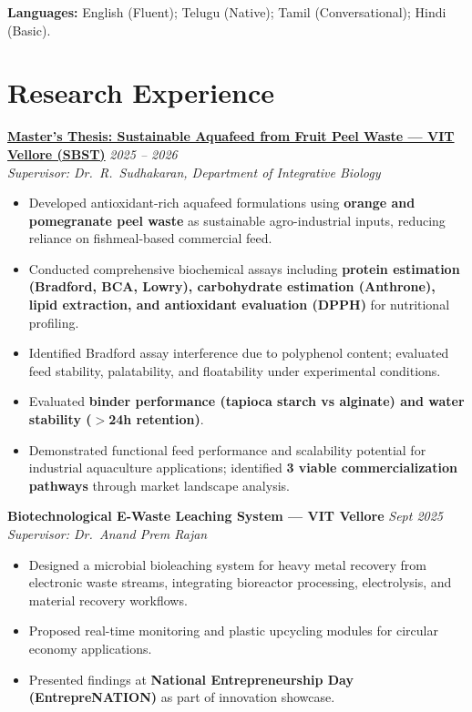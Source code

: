 \documentclass[10pt, a4paper]{article}
\newcommand{\roleentry}[2]{%
  \textbf{#1} \hfill \textit{#2}%
}
\newenvironment{rlist}{%
  \begin{itemize}[
    leftmargin=1.4em,
    itemsep=1.5pt,
    parsep=0pt,
    topsep=2pt,
    label=\textcolor{accentNavy}{\textbullet}
  ]
}{\end{itemize}}
\begin{document}
\vspace{3pt}
\textbf{Languages:} English (Fluent); Telugu (Native); Tamil (Conversational); Hindi (Basic).

\section{Research Experience}

\roleentry{\href{https://drive.google.com/file/d/1x5JwIGPe2DdukwbQDjz7zqYHEZAIdvlC/view?usp=sharing}{Master's Thesis: Sustainable Aquafeed from Fruit Peel Waste --- VIT Vellore (SBST)}}{2025 -- 2026}\\[3pt]
\textit{Supervisor: Dr.\ R.\ Sudhakaran, Department of Integrative Biology}
\begin{rlist}
  \item Developed antioxidant-rich aquafeed formulations using \textbf{orange and pomegranate peel waste} as sustainable agro-industrial inputs, reducing reliance on fishmeal-based commercial feed.
  \item Conducted comprehensive biochemical assays including \textbf{protein estimation (Bradford, BCA, Lowry), carbohydrate estimation (Anthrone), lipid extraction, and antioxidant evaluation (DPPH)} for nutritional profiling.
  \item Identified Bradford assay interference due to polyphenol content; evaluated feed stability, palatability, and floatability under experimental conditions.
  \item Evaluated \textbf{binder performance (tapioca starch vs alginate) and water stability ($>$24h retention)}.
  \item Demonstrated functional feed performance and scalability potential for industrial aquaculture applications; identified \textbf{3 viable commercialization pathways} through market landscape analysis.
\end{rlist}

\vspace{5pt}

\roleentry{Biotechnological E-Waste Leaching System --- VIT Vellore}{Sept 2025}\\[3pt]
\textit{Supervisor: Dr.\ Anand Prem Rajan}
\begin{rlist}
  \item Designed a microbial bioleaching system for heavy metal recovery from electronic waste streams, integrating bioreactor processing, electrolysis, and material recovery workflows.
  \item Proposed real-time monitoring and plastic upcycling modules for circular economy applications.
  \item Presented findings at \textbf{National Entrepreneurship Day (EntrepreNATION)} as part of innovation showcase.
\end{rlist}
\end{document}
